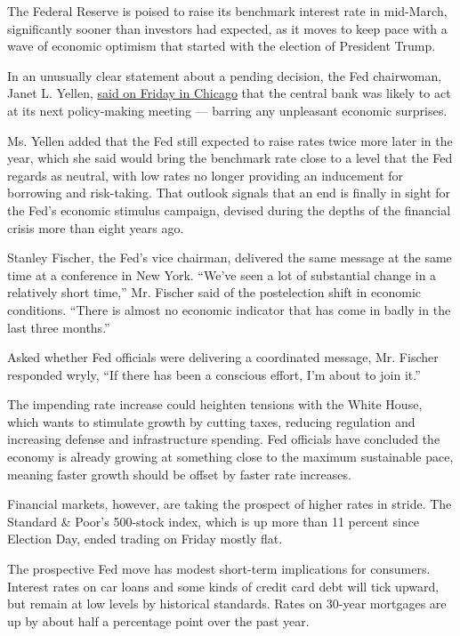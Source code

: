 The Federal Reserve is poised to raise its benchmark interest rate in
mid-March, significantly sooner than investors had expected, as it moves
to keep pace with a wave of economic optimism that started with the
election of President Trump.

In an unusually clear statement about a pending decision, the Fed
chairwoman, Janet L. Yellen,
\href{https://www.federalreserve.gov/newsevents/speech/yellen20170303a.htm}{said
on Friday in Chicago} that the central bank was likely to act at its
next policy-making meeting --- barring any unpleasant economic
surprises.

Ms. Yellen added that the Fed still expected to raise rates twice more
later in the year, which she said would bring the benchmark rate close
to a level that the Fed regards as neutral, with low rates no longer
providing an inducement for borrowing and risk-taking. That outlook
signals that an end is finally in sight for the Fed's economic stimulus
campaign, devised during the depths of the financial crisis more than
eight years ago.

Stanley Fischer, the Fed's vice chairman, delivered the same message at
the same time at a conference in New York. ``We've seen a lot of
substantial change in a relatively short time,'' Mr. Fischer said of the
postelection shift in economic conditions. ``There is almost no economic
indicator that has come in badly in the last three months.''

Asked whether Fed officials were delivering a coordinated message, Mr.
Fischer responded wryly, ``If there has been a conscious effort, I'm
about to join it.''

The impending rate increase could heighten tensions with the White
House, which wants to stimulate growth by cutting taxes, reducing
regulation and increasing defense and infrastructure spending. Fed
officials have concluded the economy is already growing at something
close to the maximum sustainable pace, meaning faster growth should be
offset by faster rate increases.

Financial markets, however, are taking the prospect of higher rates in
stride. The Standard \& Poor's 500-stock index, which is up more than 11
percent since Election Day, ended trading on Friday mostly flat.

The prospective Fed move has modest short-term implications for
consumers. Interest rates on car loans and some kinds of credit card
debt will tick upward, but remain at low levels by historical standards.
Rates on 30-year mortgages are up by about half a percentage point over
the past year.

